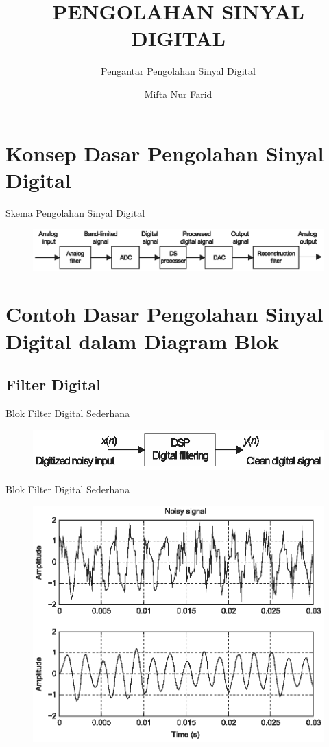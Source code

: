 \documentclass[pdflatex,compress,mathserif]{beamer}
\title{PENGOLAHAN SINYAL DIGITAL}
\subtitle{Pengantar Pengolahan Sinyal Digital}
\author{Mifta Nur Farid}
\begin{document}
\maketitle

\section{Konsep Dasar Pengolahan Sinyal Digital}

\begin{frame}{Skema Pengolahan Sinyal Digital}
	\begin{figure}
		\includegraphics[width=\linewidth]{img/img01}
	\end{figure}
\end{frame}

\section{Contoh Dasar Pengolahan Sinyal Digital dalam Diagram Blok}

\subsection{Filter Digital}

\begin{frame}{Blok Filter Digital Sederhana}
	\begin{figure}
		\includegraphics[width=\linewidth]{img/img02}
	\end{figure}
\end{frame}

\begin{frame}{Blok Filter Digital Sederhana}
	\begin{figure}
		\includegraphics[width=0.8\linewidth]{img/img03}
	\end{figure}
\end{frame}
\end{document}
